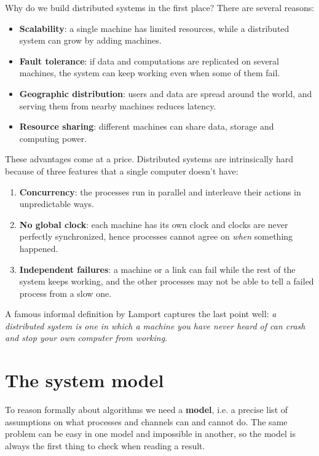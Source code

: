 Why do we build distributed systems in the first place? There are several reasons:
\begin{itemize}
  \item \textbf{Scalability}: a single machine has limited resources, while a distributed system can grow by adding machines.
  \item \textbf{Fault tolerance}: if data and computations are replicated on several machines, the system can keep working even when some of them fail.
  \item \textbf{Geographic distribution}: users and data are spread around the world, and serving them from nearby machines reduces latency.
  \item \textbf{Resource sharing}: different machines can share data, storage and computing power.
\end{itemize}

These advantages come at a price. Distributed systems are intrinsically hard because of three features that a single computer doesn't have:
\begin{enumerate}
  \item \textbf{Concurrency}: the processes run in parallel and interleave their actions in unpredictable ways.
  \item \textbf{No global clock}: each machine has its own clock and clocks are never perfectly synchronized, hence processes cannot agree on \textit{when} something happened.
  \item \textbf{Independent failures}: a machine or a link can fail while the rest of the system keeps working, and the other processes may not be able to tell a failed process from a slow one.
\end{enumerate}

A famous informal definition by Lamport captures the last point well: \emph{a distributed system is one in which a machine you have never heard of can crash and stop your own computer from working}.

\section{The system model}

To reason formally about algorithms we need a \textbf{model}, i.e. a precise list of assumptions on what processes and channels can and cannot do. The same problem can be easy in one model and impossible in another, so the model is always the first thing to check when reading a result.

